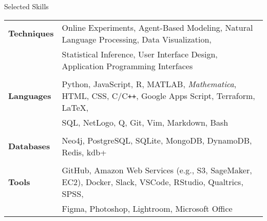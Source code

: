 \documentclass{cv} %
\begin{document}
\begin{cvSection}{Selected Skills}

  \begin{tabular}{ @{} >{\bfseries}l @{\hspace{1em}} l }
    Techniques & Online Experiments, Agent-Based Modeling, Natural Language Processing, Data Visualization,
    \\
               & Statistical Inference, User Interface Design, Application Programming Interfaces
    \\
    \\
    Languages  & Python, JavaScript, R, MATLAB, \textit{Mathematica}, HTML, CSS, C/C\texttt{++}, Google Apps Script, Terraform, \LaTeX{},
    \\
               & SQL, NetLogo, Q, Git, Vim, Markdown, Bash
    \\
    \\
    Databases  & Neo4j, PostgreSQL, SQLite, MongoDB, DynamoDB, Redis, kdb+
    \\
    \\
    Tools      & GitHub, Amazon Web Services (e.g., S3, SageMaker, EC2), Docker, Slack, VSCode, RStudio, Qualtrics, SPSS,
    \\
               & Figma, Photoshop, Lightroom, Microsoft Office
  \end{tabular}

\end{cvSection}
\end{document}

